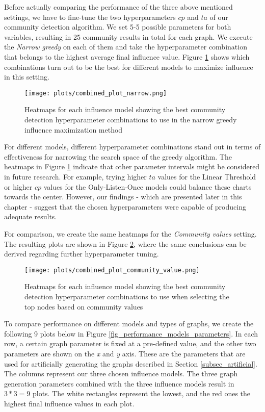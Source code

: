 \documentclass[pdflatex,sn-mathphys-num]{sn-jnl}
\begin{document}
Before actually comparing the performance of the three above mentioned settings, we have to fine-tune the two hyperparameters $cp$ and $ta$ of our community detection algorithm. We set 5-5 possible parameters for both variables, resulting in 25 community results in total for each graph. We execute the \textit{Narrow greedy} on each of them and take the hyperparameter combination that belongs to the highest average final influence value. Figure \ref{fig_best_parameters_narrow_heatmap} shows which combinations turn out to be the best for different models to maximize influence in this setting.

\begin{figure}[ht]
\centering
\texttt{[image: plots/combined\_plot\_narrow.png]}
\caption{Heatmaps for each influence model showing the best community detection hyperparameter combinations to use in the narrow greedy influence maximization method}
\label{fig_best_parameters_narrow_heatmap}
\end{figure}

For different models, different hyperparameter combinations stand out in terms of effectiveness for narrowing the search space of the greedy algorithm. The heatmaps in Figure \ref{fig_best_parameters_narrow_heatmap} indicate that other parameter intervals might be considered in future research. For example, trying higher $ta$ values for the Linear Threshold or higher $cp$ values for the Only-Listen-Once models could balance these charts towards the center. However, our findings - which are presented later in this chapter - suggest that the chosen hyperparameters were capable of producing adequate results.

For comparison, we create the same heatmaps for the \textit{Community values} setting. The resulting plots are shown in Figure \ref{fig_best_parameters_community_value_heatmap}, where the same conclusions can be derived regarding further hyperparameter tuning.

\begin{figure}[ht]
\centering
\texttt{[image: plots/combined\_plot\_community\_value.png]}
\caption{Heatmaps for each influence model showing the best community detection hyperparameter combinations to use when selecting the top nodes based on community values}
\label{fig_best_parameters_community_value_heatmap}
\end{figure}

To compare performance on different models and types of graphs, we create the following 9 plots below in Figure \ref{fig_performance_models_parameters}. In each row, a certain graph parameter is fixed at a pre-defined value, and the other two parameters are shown on the \textit{x} and \textit{y} axis. These are the parameters that are used for artificially generating the graphs described in Section \ref{subsec_artificial}. The columns represent our three chosen influence models. The three graph generation parameters combined with the three influence models result in $3*3=9$ plots. The white rectangles represent the lowest, and the red ones the highest final influence values in each plot.
\end{document}

